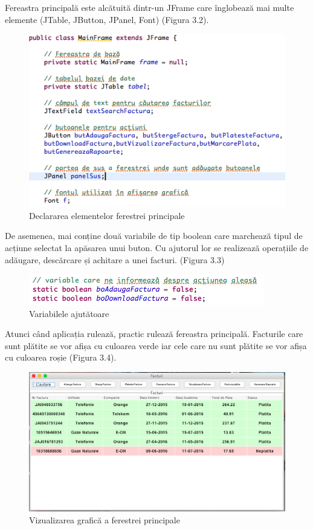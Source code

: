 \documentclass[12pt]{book}
\begin{document}
Fereastra principală este alcătuită dintr-un JFrame care înglobează mai multe elemente (JTable, JButton, JPanel, Font) (Figura 3.2).

\begin{figure}[!ht]
	\centering
	\includegraphics{FereastraPrincipala}
	\caption{Declararea elementelor ferestrei principale}
\end{figure}

De asemenea, mai conține două variabile de tip boolean care marchează tipul de acțiune selectat la apăsarea unui buton. Cu ajutorul lor se realizează operațiile de adăugare, descărcare și achitare a unei facturi. (Figura 3.3)

\begin{figure}[!ht]
	\centering
	\includegraphics{VariabileAjutatoare}
	\caption{Variabilele ajutătoare}
\end{figure}

Atunci când aplicația rulează, practic rulează fereastra principală. Facturile care sunt plătite se vor afișa cu culoarea verde iar cele care nu sunt plătite se vor afișa cu culoarea roșie (Figura 3.4).

\begin{figure}[!ht]
	\centering
	\includegraphics{FereastraPrincipalaVizualizare}
	\caption{Vizualizarea grafică a ferestrei principale}
\end{figure}
\end{document}
